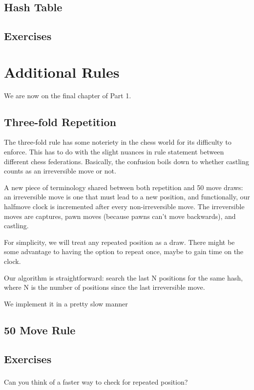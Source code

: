 \documentclass[letterpaper,11pt]{article}
\begin{document}
\subsection{Hash Table}

\subsection{Exercises}

\section{Additional Rules}

We are now on the final chapter of Part 1.

\subsection{Three-fold Repetition}

The three-fold rule has some noteriety in the chess world for its difficulty to enforce. This has 
to do with the slight nuances in rule statement between different chess federations.
Basically, the confusion boils down to whether castling counts as an irreversible move or not.

A new piece of terminology shared between both repetition and 50 move draws: an irreversible move is one that must lead to a new position, and functionally,
our halfmove clock is incremented after every non-irreversible move. The irreversible moves are 
captures, pawn moves (because pawns can't move backwards), and castling.

For simplicity, we will treat any repeated position as a draw. There might be some advantage 
to having the option to repeat once, maybe to gain time on the clock.

Our algorithm is straightforward: search the last N positions for the same hash, where N is the number of positions since the last
irreversible move.

We implement it in a pretty slow manner
\subsection{50 Move Rule}
\subsection{Exercises}

\subsubsection{}
Can you think of a faster way to check for repeated position?
\end{document}
